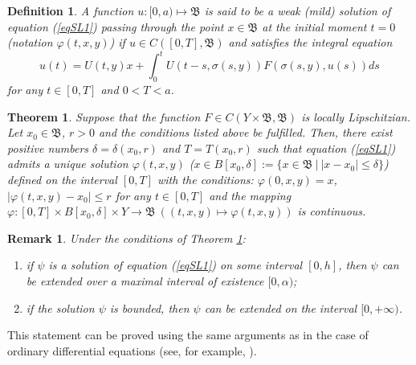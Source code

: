 \documentclass{amsart}%
\newtheorem{theorem}[lemma]{Theorem}
\newtheorem{remark}[lemma]{Remark}
\newtheorem{definition}[lemma]{Definition}
\begin{document}
\begin{definition}
A function $u:[0,a)\mapsto \mathfrak B$ is said to be a weak
(mild) solution of equation (\ref{eqSL1}) passing through the
point $x\in \mathfrak B$ at the initial moment $t=0$ (notation
$\varphi(t,x,y)$) if $u\in C([0,T],\mathfrak B)$ and satisfies the
integral equation
\begin{equation}\label{eqSL3}
u(t)=U(t,y)x+\int_{0}^{t}U(t-s,\sigma(s,y))F(\sigma(s,y),u(s))ds\nonumber
\end{equation}
for any $t\in [0,T]$ and $0<T<a$.
\end{definition}

\begin{theorem}\label{thLS1.S1} \cite[Ch.VI]{Che_2020}
Suppose that the function $F\in C(Y\times \mathfrak B,\mathfrak
B)$ is locally Lipschitzian. Let $x_0\in \mathfrak B$, $r>0 $ and
the conditions listed above be fulfilled. Then, there exist
positive numbers $\delta =\delta (x_0,r)$ and $T=T(x_0,r) $ such
that equation (\ref{eqSL1}) admits a unique solution $\varphi
(t,x,y)$ ($x\in B[x_0,\delta]:=\{x\in \mathfrak B \ | \ \vert x
-x_0 \vert \le \delta \} $) defined on the interval $[0,T]$ with
the conditions: $\varphi (0,x,y)=x$, $\vert \varphi
(t,x,y)-x_0\vert \le r$ for any $t\in [0,T]$ and the mapping $
\varphi : [0,T]\times B[x_0,\delta] \times Y \to \mathfrak B\ (
(t,x,y)\mapsto \varphi (t,x,y))$ is continuous.
\end{theorem}

\begin{remark}\label{remSL1} Under the conditions of Theorem
\ref{thLS1.S1}:
\begin{enumerate}
\item if $\psi$ is a solution of equation (\ref{eqSL1}) on some
interval $[0,h]$, then $\psi$ can be extended over a maximal
interval of existence $[0,\alpha)$; \item if the solution $\psi$
is bounded, then $\psi$ can be extended on the interval
$[0,+\infty)$.
\end{enumerate}
\end{remark}

This statement can be proved using the same arguments as in the
case of ordinary differential equations (see, for example,
\cite[Ch.IV]{Bur}).
\end{document}
